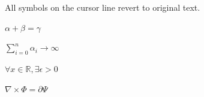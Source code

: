 \documentclass{article}
\begin{document}
All symbols on the cursor line revert to original text.

$\alpha + \beta = \gamma$

$\sum_{i=0}^{n} \alpha_i \to \infty$

$\forall x \in \mathbb{R}, \exists \epsilon > 0$

$\nabla \times \Phi = \partial \Psi$
\end{document}
